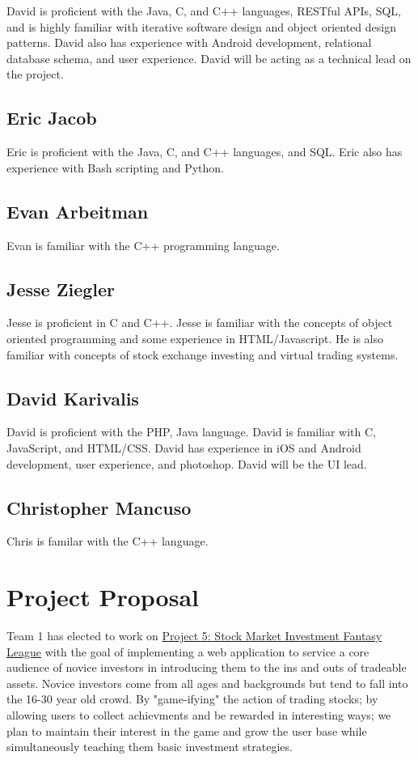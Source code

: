 \documentclass[11pt,letterpaper,oneside]{memoir}
\begin{document}
David is proficient with the Java, C, and C++ languages, RESTful APIs, SQL, and is
highly familiar with iterative software design and object oriented design patterns.
David also has experience with Android development, relational database schema, and
user experience.  David will be acting as a technical lead on the project.

\section{Eric Jacob}

Eric is proficient with the Java, C, and C++ languages, and SQL.  Eric also has
experience with Bash scripting and Python.

\section{Evan Arbeitman}

Evan is familiar with the C++ programming language.

\section{Jesse Ziegler}

Jesse is proficient in C and C++. Jesse is familiar with the concepts of object
oriented programming and some experience in HTML/Javascript. He is also familiar
with concepts of stock exchange investing and virtual trading systems.

\section{David Karivalis}

David is proficient with the PHP, Java language. David is familiar with C, JavaScript, and HTML/CSS.
David has experience in iOS and Android development, user experience, and photoshop.  David will be
the UI lead.

\section{Christopher Mancuso}

Chris is familar with the C++ language.

\chapter{Project Proposal}
\label{proposal}
Team 1 has elected to work on \href{http://ece.rutgers.edu/~marsic/books/SE/projects/}
{Project 5: Stock Market Investment Fantasy League} with the goal of implementing a
web application to service a core audience of novice investors in introducing them to
the ins and outs of tradeable assets.  Novice investors come from all ages and backgrounds
but tend to fall into the 16-30 year old crowd.  By "game-ifying" the action of trading
stocks; by allowing users to collect achievments and be rewarded in interesting ways; we
plan to maintain their interest in the game and grow the user base while simultaneously
teaching them basic investment strategies.
\end{document}
